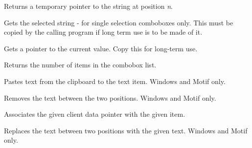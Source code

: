 
Returns a temporary pointer to the string at position {\it n}.



Gets the selected string - for single selection comboboxes only. This
must be copied by the calling program if long term use is to be made of
it.



Gets a pointer to the current value. Copy this for long-term use.



Returns the number of items in the combobox list.



Pastes text from the clipboard to the text item. Windows and Motif only.



Removes the text between the two positions. Windows and Motif only.

%
%



Associates the given client data pointer with the given item.



Replaces the text between two positions with the given text. Windows and Motif only.

%
%


